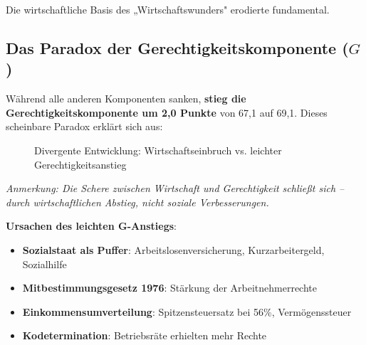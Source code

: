 Die wirtschaftliche Basis des „Wirtschaftswunders" erodierte fundamental.

\subsection{Das Paradox der Gerechtigkeitskomponente (\(G\))}

Während alle anderen Komponenten sanken, \textbf{stieg die Gerechtigkeitskomponente um 2,0 Punkte} von 67,1 auf 69,1. Dieses scheinbare Paradox erklärt sich aus:

\begin{figure}[ht]
    \centering
    \caption{Divergente Entwicklung: Wirtschaftseinbruch vs. leichter Gerechtigkeitsanstieg}
    \label{fig:divergenz_stagflation}
\end{figure}

\begin{flushleft}
\footnotesize{\textit{Anmerkung: Die Schere zwischen Wirtschaft und Gerechtigkeit schließt sich – durch wirtschaftlichen Abstieg, nicht soziale Verbesserungen.}}
\end{flushleft}

\textbf{Ursachen des leichten G-Anstiegs}:

\begin{itemize}
    \item \textbf{Sozialstaat als Puffer}: Arbeitslosenversicherung, Kurzarbeitergeld, Sozialhilfe
    \item \textbf{Mitbestimmungsgesetz 1976}: Stärkung der Arbeitnehmerrechte
    \item \textbf{Einkommensumverteilung}: Spitzensteuersatz bei 56\%, Vermögenssteuer
    \item \textbf{Kodetermination}: Betriebsräte erhielten mehr Rechte
\end{itemize}

